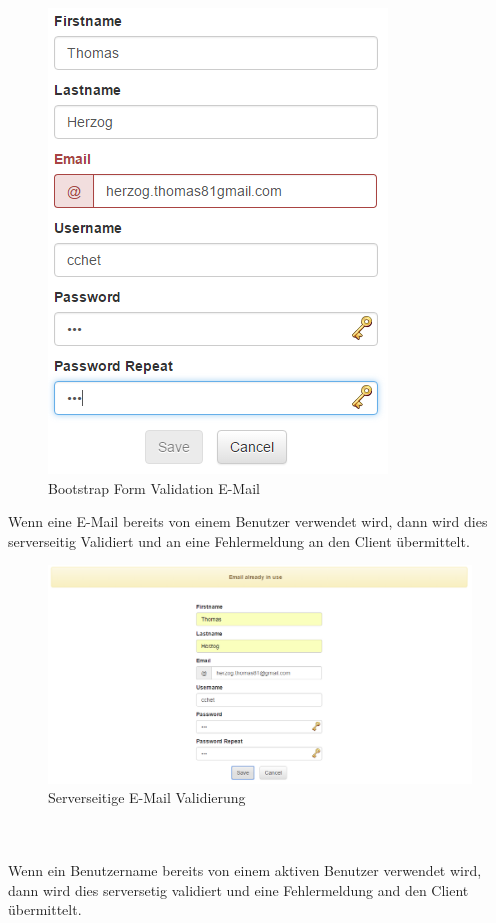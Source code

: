 \documentclass[11pt, a4paper, twoside]{article}   	%
\begin{document}
\begin{figure}[h]
	\centering
	\includegraphics[scale=0.5]{images/registration_client_validation_email.PNG}
	\caption
	{Bootstrap Form Validation E-Mail}
\end{figure}
\newpage
Wenn eine E-Mail bereits von einem Benutzer verwendet wird, dann wird dies serverseitig Validiert und an eine Fehlermeldung an den Client übermittelt.
\begin{figure}[h]
	\centering
	\includegraphics[scale=0.4]{images/registration_server_validation_email.PNG}
	\caption
	{Serverseitige E-Mail Validierung}
\end{figure}\\\\
Wenn ein Benutzername bereits von einem aktiven Benutzer verwendet wird, dann wird dies serversetig validiert und eine Fehlermeldung and den Client übermittelt.
\end{document}
